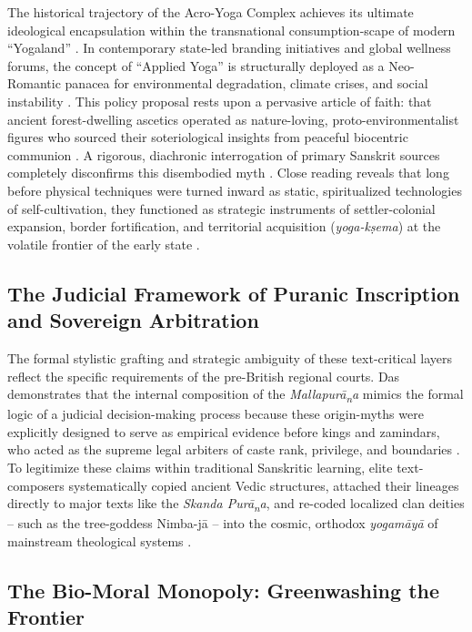 \documentclass[11pt,twoside,letterpaper]{article}
\begin{document}
The historical trajectory of the Acro-Yoga Complex achieves its ultimate ideological encapsulation within the transnational consumption-scape of modern ``Yogaland'' \cite{McCartney2021}. In contemporary state-led branding initiatives and global wellness forums, the concept of ``Applied Yoga'' is structurally deployed as a Neo-Romantic panacea for environmental degradation, climate crises, and social instability \cite{McCartney2021}. This policy proposal rests upon a pervasive article of faith: that ancient forest-dwelling ascetics operated as nature-loving, proto-environmentalist figures who sourced their soteriological insights from peaceful biocentric communion \cite{McCartney2021}. A rigorous, diachronic interrogation of primary Sanskrit sources completely disconfirms this disembodied myth \cite{Birch2024, McCartney2021}. Close reading reveals that long before physical techniques were turned inward as static, spiritualized technologies of self-cultivation, they functioned as strategic instruments of settler-colonial expansion, border fortification, and territorial acquisition (\textit{yoga-kṣema}) at the volatile frontier of the early state \cite{Birch2024, McCartney2021}.

\subsection{The Judicial Framework of Puranic Inscription and Sovereign Arbitration}
The formal stylistic grafting and strategic ambiguity of these text-critical layers reflect the specific requirements of the pre-British regional courts. Das demonstrates that the internal composition of the \textit{Mallapur\={a}\textsubscript{n}a} mimics the formal logic of a judicial decision-making process because these origin-myths were explicitly designed to serve as empirical evidence before kings and zamindars, who acted as the supreme legal arbiters of caste rank, privilege, and boundaries \cite{Das1968}. To legitimize these claims within traditional Sanskritic learning, elite text-composers systematically copied ancient Vedic structures, attached their lineages directly to major texts like the \textit{Skanda Pur\={a}\textsubscript{n}a}, and re-coded localized clan deities -- such as the tree-goddess Nimba-j\={a} -- into the cosmic, orthodox \textit{yogam\={a}y\={a}} of mainstream theological systems \cite{Das1968}.

\subsection{The Bio-Moral Monopoly: Greenwashing the Frontier}
\end{document}
